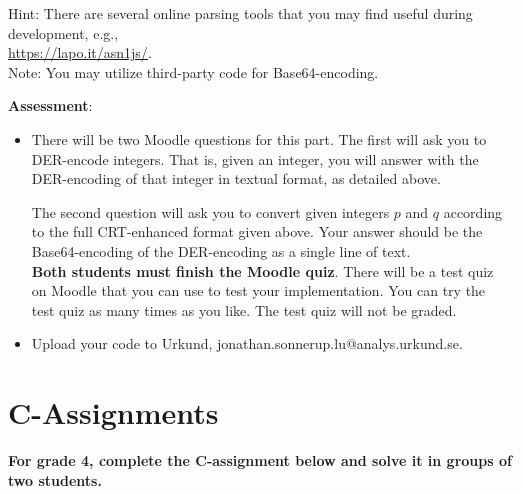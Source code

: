 \documentclass{article}
\begin{document}
\begin{description}
{				Hint: There are several online parsing tools that you may find useful during development, e.g.,\\ 
				\url{https://lapo.it/asn1js/}.\\
				Note: You may utilize third-party code for Base64-encoding.
				
				\textbf{Assessment}:
				\begin{itemize}
					\item There will be two Moodle questions for this part. The first will ask you to DER-encode integers. That is, given an integer, you will answer with the DER-encoding of that integer in textual format, as detailed above.
					
					The second question will ask you to convert given integers $p$ and $q$ according to the full CRT-enhanced format given above. Your answer should be the Base64-encoding of the DER-encoding as a single line of text.\\
					\textbf{Both students must finish the Moodle quiz}.
					There will be a test quiz on Moodle that you can use to test your implementation. You can try the test quiz as many times as you like. The test quiz will not be graded.
					\item Upload your code to Urkund, jonathan.sonnerup.lu@analys.urkund.se.
				\end{itemize}
			}
		\end{description}

		\clearpage
		
		\section*{C-Assignments}
		\textbf{For grade 4, complete the C-assignment below and solve it in groups of two students.}
		
\end{document}
